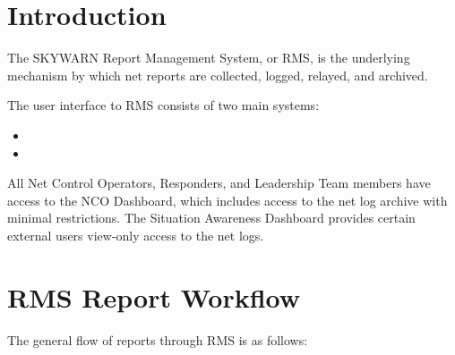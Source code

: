 \documentclass[pdflatex,letterpaper,twoside,12pt]{book}
\begin{document}

\section{Introduction}

The SKYWARN Report Management System, or RMS, is the underlying mechanism by which net reports are collected, logged, relayed, and archived.

The user interface to RMS consists of two main systems:

\begin{itemize}
\item {}
\item {}
\end{itemize}

All Net Control Operators, Responders, and Leadership Team members have access to the NCO Dashboard, which includes access to the net log archive with minimal restrictions.  The Situation Awareness Dashboard provides certain external users view-only access to the net logs.


\section{RMS Report Workflow}

The general flow of reports through RMS is as follows:
\end{document}
